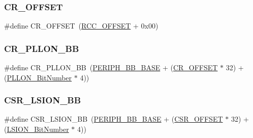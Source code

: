 \mbox{\label{group___r_c_c___private___defines_gafa1d3d0ea72132df651c76fc1bdffffc}} 
\subsubsection{\texorpdfstring{CR\_OFFSET}{CR\_OFFSET}}
{\footnotesize\ttfamily \#define C\+R\+\_\+\+O\+F\+F\+S\+ET~(\mbox{\hyperlink{group___r_c_c___private___defines_ga539e07c3b3c55f1f1d47231341fb11e1}{R\+C\+C\+\_\+\+O\+F\+F\+S\+ET}} + 0x00)}

\mbox{\label{group___r_c_c___private___defines_ga3f1fb2589cb8b5ac2f7121aba1135a5f}} 
\subsubsection{\texorpdfstring{CR\_PLLON\_BB}{CR\_PLLON\_BB}}
{\footnotesize\ttfamily \#define C\+R\+\_\+\+P\+L\+L\+O\+N\+\_\+\+BB~(\mbox{\hyperlink{group___peripheral__memory__map_gaed7efc100877000845c236ccdc9e144a}{P\+E\+R\+I\+P\+H\+\_\+\+B\+B\+\_\+\+B\+A\+SE}} + (\mbox{\hyperlink{group___r_c_c___private___defines_gafa1d3d0ea72132df651c76fc1bdffffc}{C\+R\+\_\+\+O\+F\+F\+S\+ET}} $\ast$ 32) + (\mbox{\hyperlink{group___r_c_c___private___defines_gab24d7f5f8e4b3b717fd91b54f393f6a3}{P\+L\+L\+O\+N\+\_\+\+Bit\+Number}} $\ast$ 4))}

\mbox{\label{group___r_c_c___private___defines_gaa253e36e7e5fb02998c0e4d0388abc52}} 
\subsubsection{\texorpdfstring{CSR\_LSION\_BB}{CSR\_LSION\_BB}}
{\footnotesize\ttfamily \#define C\+S\+R\+\_\+\+L\+S\+I\+O\+N\+\_\+\+BB~(\mbox{\hyperlink{group___peripheral__memory__map_gaed7efc100877000845c236ccdc9e144a}{P\+E\+R\+I\+P\+H\+\_\+\+B\+B\+\_\+\+B\+A\+SE}} + (\mbox{\hyperlink{group___r_c_c___private___defines_ga984cbe73312b6d3d355c5053763d499a}{C\+S\+R\+\_\+\+O\+F\+F\+S\+ET}} $\ast$ 32) + (\mbox{\hyperlink{group___r_c_c___private___defines_ga3f9dbe50769ce2a63ae12520433b9b40}{L\+S\+I\+O\+N\+\_\+\+Bit\+Number}} $\ast$ 4))}

